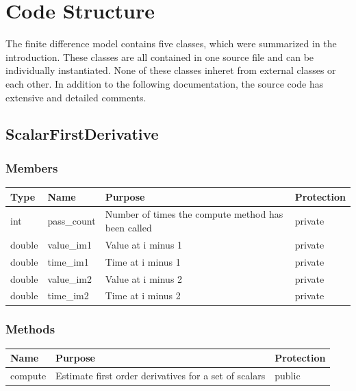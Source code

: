 \documentclass{report}
\begin{document}
\section{Code Structure}
\par The finite difference model contains five classes, which were summarized in the introduction. These classes are all contained in one source file and can be individually instantiated. None of these classes inheret from external classes or each other. In addition to the following documentation, the source code has extensive and detailed comments.

\subsection{ScalarFirstDerivative}
\subsubsection{Members}

\begin{center}
\begin{longtable}{|p{2.75cm}|p{2.8cm}|p{7.1cm}|l|} \hline
\textbf{Type} & \textbf{Name} & \textbf{Purpose} & \textbf{Protection} \\ 
\hline  
int & pass\_count & Number of times the compute method has been called & private \\ 
\hline
double & value\_im1 & Value at i minus 1 & private \\ 
\hline
double & time\_im1 & Time at i minus 1 & private \\ 
\hline
double & value\_im2 & Value at i minus 2 & private \\ 
\hline
double & time\_im2 & Time at i minus 2 & private \\
\hline 
    
\end{longtable}
\end{center}

\subsubsection{Methods}
\begin{center}
\begin{longtable}{|p{3cm}|p{10cm}|l|} \hline
\textbf{Name} & \textbf{Purpose} & \textbf{Protection} \\
\hline
\endhead
compute & Estimate first order derivatives for a set of scalars & public \\
\hline
\end{longtable}
\end{center}
\end{document}
